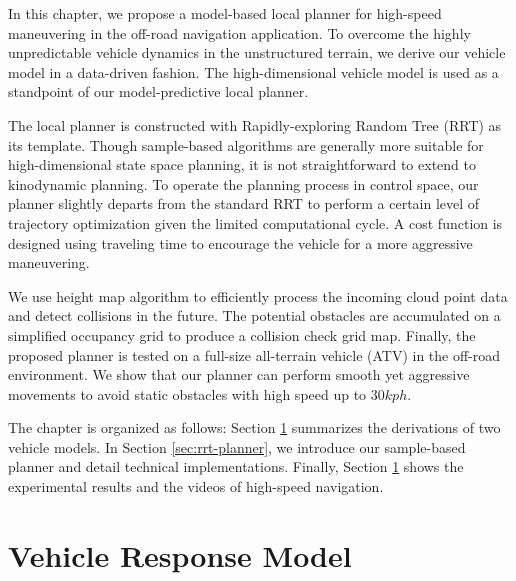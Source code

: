 \documentclass[../thesis.tex]{subfiles}
\begin{document}
 
In this chapter, we propose a model-based local planner for high-speed maneuvering in the off-road navigation application. 
To overcome the highly unpredictable vehicle dynamics in the unstructured terrain, we derive our vehicle model in a data-driven fashion. 
The high-dimensional vehicle model is used as a standpoint of our model-predictive local planner.
 
The local planner is constructed with Rapidly-exploring Random Tree (RRT) \cite{kuffner2000rrt} as its template.
Though sample-based algorithms are generally more suitable for high-dimensional state space planning, it is not straightforward to extend to kinodynamic planning.
To operate the planning process in control space, our planner slightly departs from the standard RRT to perform a certain level of trajectory optimization given the limited computational cycle.
A cost function is designed using traveling time to encourage the vehicle for a more aggressive maneuvering.
 
We use height map algorithm to efficiently process the incoming cloud point data and detect collisions in the future.
The potential obstacles are accumulated on a simplified occupancy grid to produce a collision check grid map.
Finally, the proposed planner is tested on a full-size all-terrain vehicle (ATV) in the off-road environment. 
We show that our planner can perform smooth yet aggressive movements to avoid static obstacles with high speed up to $30 kph$.
 
The chapter is organized as follows:
Section \ref{sec:vehicle_model} summarizes the derivations of two vehicle models. 
In Section \ref{sec:rrt-planner}, we introduce our sample-based planner and detail technical implementations.
Finally, Section \ref{sec:vehicle_model} shows the experimental results and the videos of high-speed navigation.
 
\section{Vehicle Response Model} \label{sec:vehicle_model}
 
\end{document}
